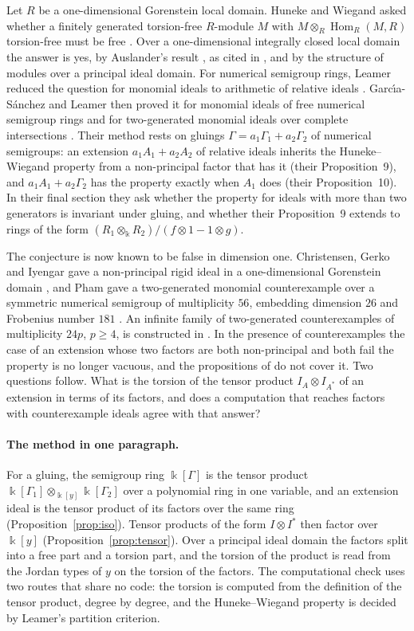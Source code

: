 \documentclass[11pt]{article}
\theoremstyle{definition}
\theoremstyle{remark}
\newcommand{\kk}{\Bbbk}
\begin{document}
Let $R$ be a one-dimensional Gorenstein local domain. Huneke and Wiegand asked whether a finitely generated
torsion-free $R$-module $M$ with $M\otimes_R\operatorname{Hom}_R(M,R)$ torsion-free must be free
\cite{HunekeWiegand1994}. Over a one-dimensional integrally closed local domain the answer is yes, by
Auslander's result \cite[3.3]{Auslander1961}, as cited in \cite{GarciaSanchezLeamer2013}, and by the structure of modules over a principal ideal domain.
For numerical semigroup rings, Leamer reduced the question for monomial ideals to arithmetic of relative ideals
\cite{Leamer2012}. Garc\'{\i}a-S\'anchez and Leamer then proved it for monomial ideals of free numerical semigroup
rings and for two-generated monomial ideals over complete intersections \cite{GarciaSanchezLeamer2013}. Their
method rests on gluings $\Gamma=a_1\Gamma_1+a_2\Gamma_2$ of numerical semigroups: an extension $a_1A_1+a_2A_2$ of
relative ideals inherits the Huneke--Wiegand property from a non-principal factor that has it (their Proposition~9),
and $a_1A_1+a_2\Gamma_2$ has the property exactly when $A_1$ does (their Proposition~10). In their final section they
ask whether the property for ideals with more than two generators is invariant under gluing, and whether their
Proposition~9 extends to rings of the form $(R_1\otimes_\kk R_2)/(f\otimes1-1\otimes g)$.

The conjecture is now known to be false in dimension one. Christensen, Gerko and Iyengar gave a non-principal
rigid ideal in a one-dimensional Gorenstein domain \cite{ChristensenGerkoIyengar2026}, and Pham gave a
two-generated monomial counterexample over a symmetric numerical semigroup of multiplicity $56$, embedding
dimension $26$ and Frobenius number $181$ \cite{Pham2026}. An infinite family of two-generated counterexamples of
multiplicity $24p$, $p\ge4$, is constructed in \cite{SantibanezLeal2026}. In the presence of counterexamples the
case of an extension whose two factors are both non-principal and both fail the property is no longer vacuous,
and the propositions of \cite{GarciaSanchezLeamer2013} do not cover it. Two questions follow. What is the torsion
of the tensor product $I_A\otimes I_{A^*}$ of an extension in terms of its factors, and does a computation that
reaches factors with counterexample ideals agree with that answer?

\paragraph{The method in one paragraph.}
For a gluing, the semigroup ring $\kk[\Gamma]$ is the tensor product $\kk[\Gamma_1]\otimes_{\kk[y]}\kk[\Gamma_2]$
over a polynomial ring in one variable, and an extension ideal is the tensor product of its factors over the same
ring (Proposition~\ref{prop:iso}). Tensor products of the form $I\otimes I^{*}$ then factor over $\kk[y]$
(Proposition~\ref{prop:tensor}). Over a principal ideal domain the factors split into a free part and a torsion
part, and the torsion of the product is read from the Jordan types of $y$ on the torsion of the factors. The
computational check uses two routes that share no code: the torsion is computed from the definition of the tensor
product, degree by degree, and the Huneke--Wiegand property is decided by Leamer's partition criterion.
\end{document}
